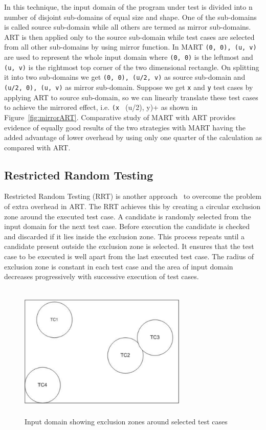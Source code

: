 In this technique, the input domain of the program under test is divided into n number of disjoint sub-domains of equal size and shape. One of the sub-domains is called source sub-domain while all others are termed as mirror sub-domains. ART is then applied only to the source sub-domain while test cases are selected from all other sub-domains by using mirror function. In MART \verb+(0, 0), (u, v)+ are used to represent the whole input domain where \verb+(0, 0)+ is the leftmost and \verb+(u, v)+ is the rightmost top corner of the two dimensional rectangle. On splitting it into two sub-domains we get \verb+(0, 0), (u/2, v)+ as source sub-domain and \verb+(u/2, 0), (u, v)+ as mirror sub-domain. Suppose we get \verb+x+ and \verb+y+ test cases by applying ART to source sub-domain, so we can linearly translate these test cases to achieve the mirrored effect, i.e. \verb+(x + (u/2), y)+ as shown in Figure~\ref{fig:mirrorART}. Comparative study of MART with ART provides evidence of equally good results of the two strategies with MART having the added advantage of lower overhead by using only one quarter of the calculation as compared with ART.


\subsection{Restricted Random Testing}
Restricted Random Testing (RRT) is another approach~\cite{chan2003normalized} to overcome the problem of extra overhead in ART. The RRT achieves this by creating a circular exclusion zone around the executed test case. A candidate is randomly selected from the input domain for the next test case. Before execution the candidate is checked and discarded if it lies inside the exclusion zone. This process repeats until a candidate present outside the exclusion zone is selected. It ensures that the test case to be executed is well apart from the last executed test case. The radius of exclusion zone is constant in each test case and the area of input domain decreases progressively with successive execution of test cases.

\begin{figure}[h]
	\centering
	\includegraphics[width= 8cm, height = 6.5cm]{chapter2/RRT.pdf}
	\caption{Input domain showing exclusion zones around selected test cases}
\end{figure}

